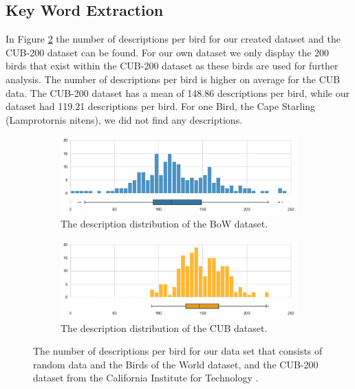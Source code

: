 \documentclass[a4paper, 12pt, oneside]{book} %
\begin{document}
\subsection{Key Word Extraction} \label{par:results_keywords}
In Figure \ref{fig:CUB_distribution} the number of descriptions per bird for our created dataset and the CUB-200 dataset can be found.
For our own dataset we only display the 200 birds that exist within the CUB-200 dataset as these birds are used for further analysis.
The number of descriptions per bird is higher on average for the CUB data.
The CUB-200 dataset has a mean of 148.86 descriptions per bird, while our dataset had 119.21 descriptions per bird.
For one Bird, the Cape Starling (Lamprotornis nitens), we did not find any descriptions.


\begin{figure} [htpb]
     \centering
     \begin{subfigure}[b]{1\textwidth}
         \centering
         \includegraphics[width=\textwidth]{figures/CUB_distribution_BOW.pdf}
         \caption{The description distribution of the BoW dataset.}
         \label{fig:BOW_distribution}
     \end{subfigure}
     \vfill
     \begin{subfigure}[b]{1\textwidth}
         \centering
         \includegraphics[width=\textwidth]{figures/CUB_distribution_CUB.pdf}
         \caption{The description distribution of the CUB dataset.}
         \label{fig:CUB_distribution}
     \end{subfigure}
     \caption[Bird description distribution]{The number of descriptions per bird for our data set that consists of random data and the Birds of the World dataset, and the CUB-200 dataset from the California Institute for Technology \autocite{welinder_caltech-ucsd_2010}. }
 \label{fig:CUBBOW_distribution}
\end{figure}
\end{document}
